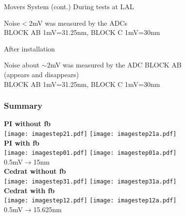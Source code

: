 Movers System (cont.)
During tests at LAL\par
\begin{center}
\end{center}
Noise$<$2mV was measured by the ADCs\\
{\tiny BLOCK AB 1mV=31.25nm, BLOCK C 1mV=30nm}\par
After installation\par
\begin{center}
\end{center}
Noise about $\sim$2mV was measured by the ADC BLOCK AB\\
 (appears and disappears)\\
{\tiny BLOCK AB 1mV=31.25nm, BLOCK C 1mV=30nm}\par


 \raggedright
\subsubsection{Summary}
\textbf{PI without  fb}\\
\texttt{[image: imagestep21.pdf]}
\texttt{[image: imagestep21a.pdf]}\\
\textbf{PI with  fb}\\
\texttt{[image: imagestep01.pdf]}
\texttt{[image: imagestep01a.pdf]}\\
{\scriptsize 0.5mV$\rightarrow$15nm}\\
\textbf{Cedrat without fb}\\
\texttt{[image: imagestep31.pdf]}
\texttt{[image: imagestep31a.pdf]}\\
\textbf{Cedrat with fb}\\
\texttt{[image: imagestep12.pdf]}
\texttt{[image: imagestep12a.pdf]}\\
{\scriptsize 0.5mV$\rightarrow$15.625nm}\\

